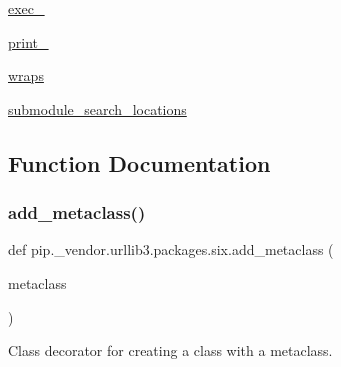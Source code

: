 \begin{DoxyCompactItemize}
\item 
\hyperlink{namespacepip_1_1__vendor_1_1urllib3_1_1packages_1_1six_a98d2262afd026e03b673c4eb94e1c594}{exec\+\_\+}
\item 
\hyperlink{namespacepip_1_1__vendor_1_1urllib3_1_1packages_1_1six_aee80ffc613686fe344b36799ade2784a}{print\+\_\+}
\item 
\hyperlink{namespacepip_1_1__vendor_1_1urllib3_1_1packages_1_1six_a464558f96c98043b3cdb8564d33e5333}{wraps}
\item 
\hyperlink{namespacepip_1_1__vendor_1_1urllib3_1_1packages_1_1six_a7e393952959c1a54c5b77b9ac3ffe46b}{submodule\+\_\+search\+\_\+locations}
\end{DoxyCompactItemize}


\subsection{Function Documentation}
\mbox{\label{namespacepip_1_1__vendor_1_1urllib3_1_1packages_1_1six_a94117f1460abcd6accd709543e707bc8}} 
\subsubsection{\texorpdfstring{add\+\_\+metaclass()}{add\_metaclass()}}
{\footnotesize\ttfamily def pip.\+\_\+vendor.\+urllib3.\+packages.\+six.\+add\+\_\+metaclass (\begin{DoxyParamCaption}\item[{}]{metaclass }\end{DoxyParamCaption})}

\begin{DoxyVerb}Class decorator for creating a class with a metaclass.\end{DoxyVerb}
 \mbox{\label{namespacepip_1_1__vendor_1_1urllib3_1_1packages_1_1six_ad933e7c61c57b643edcbbba25aa25472}} 
